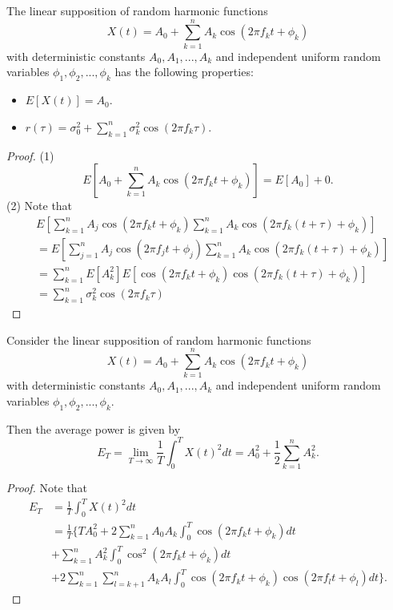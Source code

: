 \begin{refsection}
\begin{lemma}\cite[38]{lindgren2013stationary}
	The linear supposition of random harmonic functions	
	$$X(t) = A_0 + \sum_{k=1}^n A_k \cos(2\pi f_k t + \phi_k)$$
	with deterministic constants $A_0, A_1,...,A_k$ and independent uniform random variables $\phi_1,\phi_2,...,\phi_k$ has the following properties:
	\begin{itemize}
		\item $E[X(t)] = A_0.$
		\item $r(\tau) = \sigma_0^2 + \sum_{k=1}^n \sigma_k^2 \cos (2\pi f_k \tau)$.
	\end{itemize}	
\end{lemma}
\begin{proof}
	(1) 
	$$E[ A_0 + \sum_{k=1}^n A_k \cos(2\pi f_k t + \phi_k)] = E[A_0] + 0.$$
	(2)
	Note that
	\begin{align*}
	& E[\sum_{k=1}^n A_j \cos(2\pi f_k t + \phi_k) \sum_{k=1}^n A_k \cos(2\pi f_k (t+\tau) + \phi_k)] \\
	&= E[\sum_{j=1}^n A_j \cos(2\pi f_j t + \phi_j) \sum_{k=1}^n A_k \cos(2\pi f_k (t+\tau) + \phi_k)] \\
	&= \sum_{k=1}^n E[ A_k^2] E[ \cos(2\pi f_k t + \phi_k) \cos(2\pi f_k (t+\tau) + \phi_k)] \\
	&= \sum_{k=1}^n \sigma_k^2 \cos (2\pi f_k \tau)
	\end{align*}
\end{proof}




\begin{lemma}\cite[39]{lindgren2013stationary}
	Consider the linear supposition of random harmonic functions	
	$$X(t) = A_0 + \sum_{k=1}^n A_k \cos(2\pi f_k t + \phi_k)$$
	with deterministic constants $A_0, A_1,...,A_k$ and independent uniform random variables $\phi_1,\phi_2,...,\phi_k$.
	
	Then the average power is given by
	$$E_T = \lim_{T\to \infty} \frac{1}{T}\int_0^T X(t)^2 dt = A_0^2 + \frac{1}{2}\sum_{k=1}^n A_k^2.$$	
\end{lemma}
\begin{proof}
	Note that	
	\begin{align*}
	E_T &= \frac{1}{T}\int_0^T X(t)^2 dt \\
	&= \frac{1}{T}\{TA_0^2 + 2\sum_{k=1}^n A_0A_k\int_0^T \cos(2\pi f_k t + \phi_k) dt \\
	& + \sum_{k=1}^n A_k^2 \int_0^T \cos^2(2\pi f_k t + \phi_k)dt \\
	& + 2\sum_{k=1}^n\sum_{l = k+1}^n  A_kA_l \int_0^T \cos(2\pi f_k t + \phi_k)\cos(2\pi f_l t + \phi_l)dt 
	\}.
	\end{align*}
	

\end{proof}
\end{refsection}
